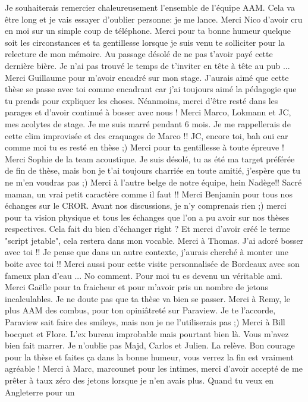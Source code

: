 Je souhaiterais remercier chaleureusement
l'ensemble de l'équipe AAM. Cela va être long et je vais
essayer d'oublier personne: je me lance. 
Merci Nico d'avoir cru en moi sur un simple coup
de téléphone. Merci pour ta bonne humeur quelque soit les
circonstances et ta gentillesse lorsque je suis venu te solliciter
pour la relecture de mon mémoire. Au passage désolé de ne pas
t'avoir payé cette dernière bière. Je n'ai pas trouvé le temps de t'inviter
en tête à tête au pub ... Merci Guillaume pour m'avoir encadré
sur mon stage. J'aurais aimé que cette thèse se passe avec toi comme
encadrant car j'ai toujours aimé la pédagogie que
tu prends pour expliquer les choses. 
Néanmoins, merci d'être resté dans les parages et d'avoir
continué à bosser avec nous !
Merci Marco, Lokmann
et JC, mes acolytes de stage. Je me suis marré pendant 6 mois.
Je me rappellerais de cette clim improvisée et des craquages de Marco !!
JC, encore toi, bah oui car comme moi tu es resté en thèse ;)
Merci pour ta gentillesse à toute épreuve ! Merci Sophie de
la team acoustique. Je suis désolé, tu as été ma target préférée
de fin de thèse, mais bon je t'ai toujours charriée en toute amitié,
j'espère que tu ne m'en voudras pas ;) 
Merci à l'autre belge de notre équipe, hein Nadège!! 
Sacré maman, un vrai petit caractère comme il faut !! Merci Benjamin
pour tous nos échanges sur le CROR. Avant nos discussions, je n'y
comprenais rien ;) merci pour ta vision physique et tous les échanges
que l'on a pu avoir sur nos thèses respectives. Cela fait du bien
d'échanger right ? Et merci d'avoir créé le terme "script jetable",
cela restera dans mon vocable. Merci à Thomas. J'ai adoré bosser avec
toi !! Je pense que dans un autre contexte, j'aurais cherché à
monter une boite avec toi !! Merci aussi pour cette visite personnalisée
de Bordeaux avec son fameux plan d'eau ... No comment. Pour moi tu es
devenu un véritable ami. Merci Gaëlle
pour ta fraicheur et pour m'avoir pris un nombre de jetons incalculables.
Je ne doute pas que ta thèse va bien se passer.
Merci à Remy, le plus AAM des combus, pour ton opiniâtreté sur Paraview.
Je te l'accorde, Paraview sait faire des smileys, 
mais non je ne l'utiliserais pas ;)
Merci à Bill bocquet et Flore. L'ex bureau improbable mais pourtant
bien là. Vous m'avez bien fait marrer. Je n'oublie pas Majd, Carlos et Julien.
La relève. Bon courage pour la thèse et faites ça dans la bonne humeur, vous
verrez la fin est vraiment agréable !
Merci à Marc, marcounet pour les intimes, merci d'avoir accepté de me prêter à taux
zéro des
jetons lorsque je n'en avais plus. Quand tu veux en Angleterre pour un
